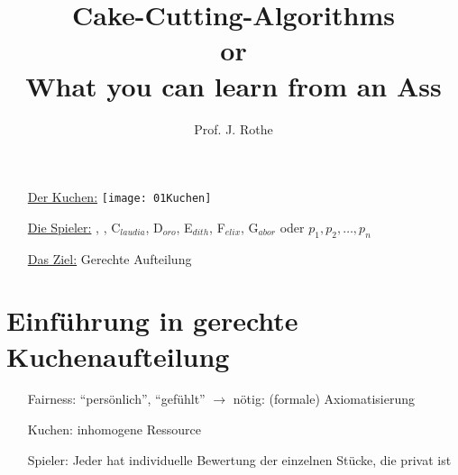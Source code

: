 \documentclass[a4paper,10pt]{scrartcl}
\title{Cake-Cutting-Algorithms\\or\\What you can learn from an Ass}
\author{Prof. J. Rothe}
\begin{document}
\maketitle

 \begin{abstract}

 \begin{center}
  \begin{figure}
  \hfill
  \end{figure}
 \end{center}
 \end{abstract}

\newpage
\section*{}
 \begin{itemize}
  \item[ \underline{Der Kuchen:}] \texttt{[image: 01Kuchen]}
  \item[ \underline{Die Spieler:}] , , C$_{laudia}$, D$_{oro}$, E$_{dith}$, F$_{elix}$, G$_{abor}$ oder 
       $p_1,p_2,\ldots,p_n$
  \item[ \underline{Das Ziel:}] Gerechte Aufteilung 
 \end{itemize}

\section{Einführung in gerechte Kuchenaufteilung}
 \begin{itemize}
  \item[Fairness:] ``persönlich'', ``gefühlt'' $\rightarrow$ nötig: (formale) Axiomatisierung
  \item[Kuchen:] inhomogene Ressource
  \item[Spieler:] Jeder hat individuelle Bewertung der einzelnen Stücke, die privat ist
 \end{itemize}                                                                          
 
\end{document}
